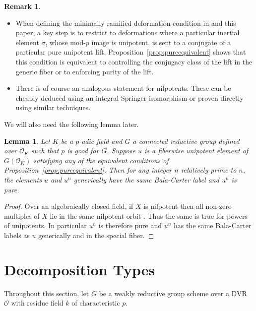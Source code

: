 \documentclass[11pt, letterpaper,english]{amsart}
\theoremstyle{plain}
\newtheorem{lemma}[lem]{Lemma}
\theoremstyle{definition}
\newtheorem{remark}[lem]{Remark}
\numberwithin{equation}{section}
\numberwithin{lem}{section}
\newcommand{\cO}{\mathcal{O}}
\begin{document}
\begin{remark}
\begin{itemize}
    \item   When defining the minimally ramified deformation condition in \cite{Booher19} and this paper, a key step is to restrict to deformations where a particular inertial element $\sigma$, whose mod-$p$ image is unipotent, is sent to a conjugate of a particular pure unipotent lift.  Proposition~\ref{prop:pureequivalent} shows that this condition is equivalent to controlling the conjugacy class of the lift in the generic fiber or to enforcing purity of the lift.

    \item  There is of course an analogous statement for nilpotents.  These can be cheaply deduced using an integral Springer isomorphism \cite[Theorem 1.1]{Integral-Springer} or proven directly using similar techniques.
    
\end{itemize}
\end{remark}

We will also need the following lemma later.

\begin{lemma} \label{lem:conjugacypower}
Let $K$ be a $p$-adic field and $G$ a connected reductive group defined over $\cO_K$ such that $p$ is good for $G$.   Suppose $u$ is a fiberwise unipotent element of $G(\cO_K)$ satisfying any of the equivalent conditions of Proposition~\ref{prop:pureequivalent}.  Then for any integer $n$ relatively prime to $n$, the elements $u$ and $u^n$ generically have the same Bala-Carter label and $u^n$ is pure.
\end{lemma}

\begin{proof}
Over an algebraically closed field, if $X$ is nilpotent then all non-zero multiples of $X$ lie in the same nilpotent orbit \cite[2.10 Lemma]{jantzen04}.  Thus the same is true for powers of unipotents.  In particular $u^n$ is therefore pure and $u^n$ has the same Bala-Carter labels as $u$ generically and in the special fiber.
\end{proof}

\section{Decomposition Types} \label{sec:decomp types}
Throughout this section, let $G$ be a weakly reductive group scheme over a DVR $\cO$ with residue field $k$ of characteristic $p$. 
\end{document}
